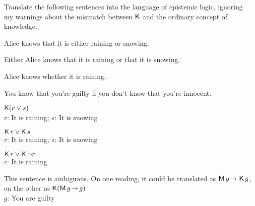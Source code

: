 
\begin{exercise}
  Translate the following sentences into the language of epistemic logic,
  ignoring my warnings about the mismatch between $\operatorname{\mathsf{K}{}}$ and the ordinary concept
  of knowledge.
  \begin{exlist}
  \item Alice knows that it is either raining or snowing.
  \item Either Alice knows that it is raining or that it is snowing.
  \item Alice knows whether it is raining.
  \item You know that you're guilty if you don't know that you're innocent.
  \end{exlist}
\end{exercise}
\begin{solution}
  \begin{sollist}
  \item $\operatorname{\mathsf{K}{}}(r \lor s)$\\
    $r$: It is raining; $s$: It is snowing\\[-2mm]
  \item $\operatorname{\mathsf{K}{}} r \lor \operatorname{\mathsf{K}{}} s$\\
    $r$: It is raining; $s$: It is snowing\\[-2mm]
  \item $\operatorname{\mathsf{K}{}} r \lor \operatorname{\mathsf{K}{}} \neg r$\\
    $r$: It is raining\\[-2mm]
  \item This sentence is ambiguous. On one reading, it could be translated as $\Mi g\to \Kn g$, on the other as $\Kn(\Mi g \to g)$\\
    $g$: You are guilty
  \end{sollist}
\end{solution}

